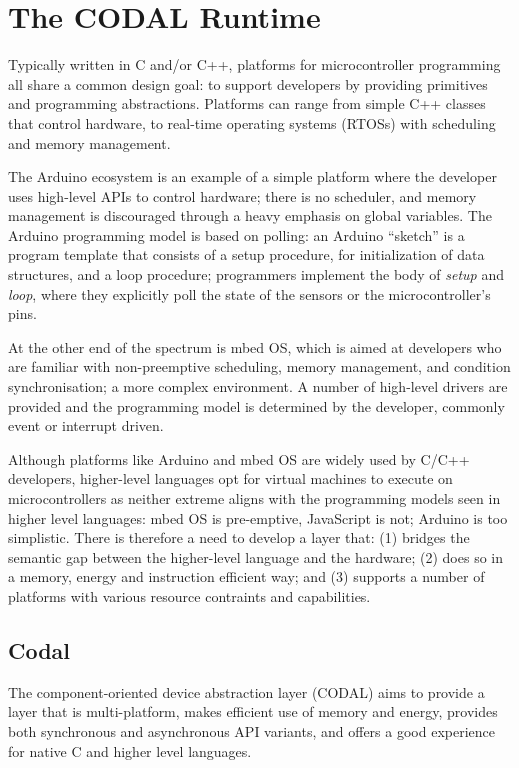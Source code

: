 \section{The CODAL Runtime}
\label{sec:codal}

Typically written in C and/or C++, platforms for microcontroller programming all share a common design goal: to support developers by providing primitives and programming abstractions. Platforms can range from simple C++ classes that control hardware, to real-time operating systems (RTOSs) with scheduling and memory management.

The Arduino ecosystem is an example of a simple platform where the developer uses high-level APIs to control hardware; there is no scheduler, and memory management is discouraged through a heavy emphasis on global variables.  The Arduino programming model is based on polling: an Arduino ``sketch'' is a program template that consists of a setup procedure, for initialization of data structures, and a loop procedure; programmers implement the body of \textit{setup} and \textit{loop}, where they explicitly poll the state of the sensors or the microcontroller's pins.

At the other end of the spectrum is mbed OS, which is aimed at developers who are familiar with non-preemptive scheduling, memory management, and condition synchronisation; a more complex environment. A number of high-level drivers are provided and the programming model is determined by the developer, commonly event or interrupt driven.

Although platforms like Arduino and mbed OS are widely used by C/C++ developers, higher-level languages opt for virtual machines to execute on microcontrollers as neither extreme aligns with the programming models seen in higher level languages: mbed OS is pre-emptive, JavaScript is not; Arduino is too simplistic. There is therefore a need to develop a layer that: (1) bridges the semantic gap between the higher-level language and the hardware; (2) does so in a memory, energy and instruction efficient way; and (3) supports a number of platforms with various resource contraints and capabilities.

\subsection{Codal}

The component-oriented device abstraction layer (CODAL) aims to provide a layer that is multi-platform, makes efficient use of memory and energy, provides both synchronous and asynchronous API variants, and offers a good experience for native C and higher level languages.

